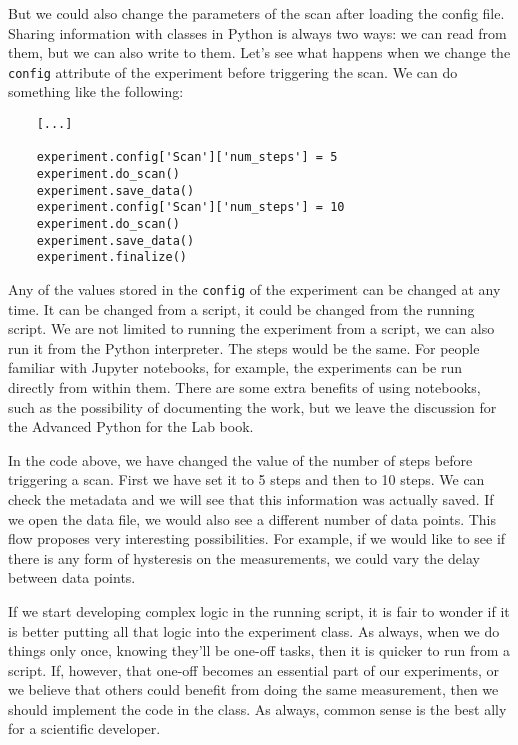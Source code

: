 But we could also change the parameters of the scan after loading the config file. Sharing information with classes in Python is always two ways: we can read from them, but we can also write to them. Let's see what happens when we change the \texttt{config} attribute of the experiment before triggering the scan. We can do something like the following:

\begin{verbatim}
    [...]

    experiment.config['Scan']['num_steps'] = 5
    experiment.do_scan()
    experiment.save_data()
    experiment.config['Scan']['num_steps'] = 10
    experiment.do_scan()
    experiment.save_data()
    experiment.finalize()
\end{verbatim}

Any of the values stored in the \texttt{config} of the experiment can be changed at any time. It can be changed from a script, it could be changed from the running script. We are not limited to running the experiment from a script, we can also run it from the Python interpreter. The steps would be the same. For people familiar with Jupyter notebooks, for example, the experiments can be run directly from within them. There are some extra benefits of using notebooks, such as the possibility of documenting the work, but we leave the discussion for the Advanced Python for the Lab book.


In the code above, we have changed the value of the number of steps before triggering a scan. First we have set it to 5 steps and then to 10 steps. We can check the metadata and we will see that this information was actually saved. If we open the data file, we would also see a different number of data points. This flow proposes very interesting possibilities. For example, if we would like to see if there is any form of hysteresis on the measurements, we could vary the delay between data points.


If we start developing complex logic in the running script, it is fair to wonder if it is better putting all that logic into the experiment class. As always, when we do things only once, knowing they'll be one-off tasks, then it is quicker to run from a script. If, however, that one-off becomes an essential part of our experiments, or we believe that others could benefit from doing the same measurement, then we should implement the code in the class. As always, common sense is the best ally for a scientific developer.

